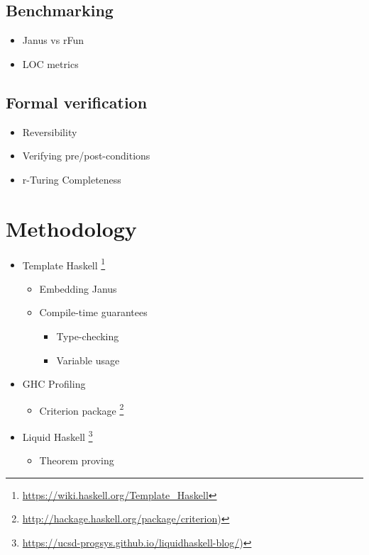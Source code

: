\documentclass[12pt,a4paper]{article}
\begin{document}
	\subsection{Benchmarking}
	\begin{itemize}
		\item{Janus vs rFun}
		\item{LOC metrics}
	\end{itemize}
	
	\subsection{Formal verification}
	\begin{itemize}
		\item{Reversibility}
		\item{Verifying pre/post-conditions}
		\item{r-Turing Completeness}
	\end{itemize}

\section{Methodology}
\begin{itemize}
	\item{Template Haskell \footnote{\url{https://wiki.haskell.org/Template_Haskell}}}
	\begin{itemize}
		\item{Embedding Janus}
		\item{Compile-time guarantees}
		\begin{itemize}
			\item{Type-checking}
			\item{Variable usage}
		\end{itemize}
		
	\end{itemize}
	
	\item{GHC Profiling}
	\begin{itemize}
		\item{Criterion package \footnote{\url{http://hackage.haskell.org/package/criterion})}}
	\end{itemize}
	
	\item{Liquid Haskell \footnote{\url{https://ucsd-progsys.github.io/liquidhaskell-blog/})}}
	\begin{itemize}
		\item{Theorem proving}
	\end{itemize}
\end{itemize}
\end{document}
